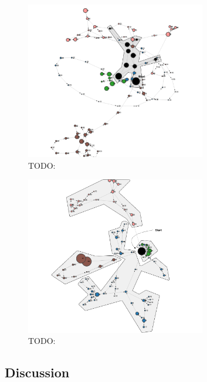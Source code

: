 \begin{figure}[H]
    \centering
    \includegraphics[width=0.7\textwidth]{figures/overlap1}
    \caption{TODO:}
    \label{fig:overlap1}
\end{figure}

\begin{figure}[H]
    \centering
    \includegraphics[width=0.7\textwidth]{figures/overlap2}
    \caption{TODO:}
    \label{fig:overlap2}
\end{figure}

\subsection{Discussion}




\cleardoublepage